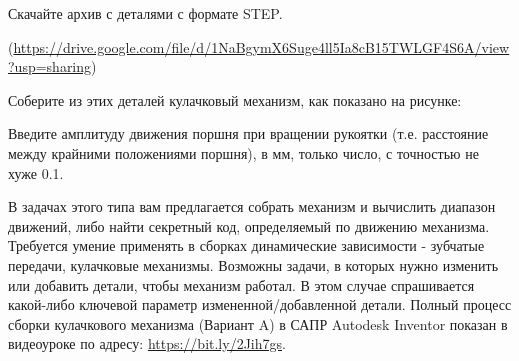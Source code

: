 
Скачайте архив с деталями с формате STEP. 

(\url{https://drive.google.com/file/d/1NaBgymX6Suge4ll5Ia8cB15TWLGF4S6A/view?usp=sharing}) 

Соберите из этих деталей кулачковый механизм, как показано на рисунке:


Введите амплитуду движения поршня при вращении рукоятки (т.е. расстояние между крайними положениями поршня), в мм, только число, с точностью не хуже 0.1.

\explanationSection

В задачах этого типа вам предлагается собрать механизм и вычислить диапазон движений, либо найти секретный код, определяемый по движению механизма.  Требуется умение применять в сборках динамические зависимости - зубчатые передачи, кулачковые механизмы.  Возможны задачи, в которых нужно изменить или добавить детали, чтобы механизм работал.  В этом случае спрашивается какой-либо ключевой параметр измененной/добавленной детали.
Полный процесс сборки кулачкового механизма (Вариант A) в САПР Autodesk Inventor показан в видеоуроке по адресу: \url{https://bit.ly/2Jih7gs}.

